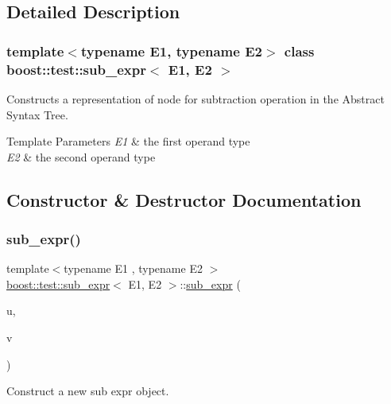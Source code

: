 \subsection{Detailed Description}
\subsubsection*{template$<$typename E1, typename E2$>$\newline
class boost\+::test\+::sub\+\_\+expr$<$ E1, E2 $>$}

Constructs a representation of node for subtraction operation in the Abstract Syntax Tree. 


\begin{DoxyTemplParams}{Template Parameters}
{\em E1} & the first operand type \\
\hline
{\em E2} & the second operand type \\
\hline
\end{DoxyTemplParams}


\subsection{Constructor \& Destructor Documentation}
\mbox{\label{classboost_1_1test_1_1sub__expr_a4f0916c0429686fe13a7d577593b43b6}} 
\subsubsection{\texorpdfstring{sub\_expr()}{sub\_expr()}}
{\footnotesize\ttfamily template$<$typename E1 , typename E2 $>$ \\
\mbox{\hyperlink{classboost_1_1test_1_1sub__expr}{boost\+::test\+::sub\+\_\+expr}}$<$ E1, E2 $>$\+::\mbox{\hyperlink{classboost_1_1test_1_1sub__expr}{sub\+\_\+expr}} (\begin{DoxyParamCaption}\item[{E1 const \&}]{u,  }\item[{E2 const \&}]{v }\end{DoxyParamCaption})\hspace{0.3cm}{\ttfamily [inline]}}



Construct a new sub expr object. 


